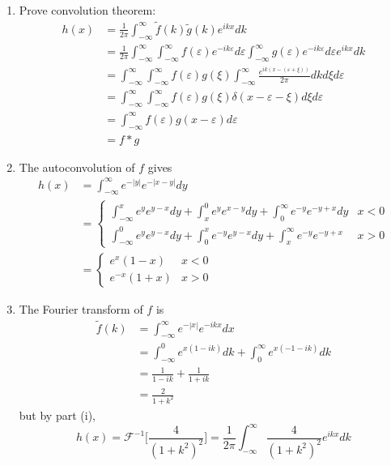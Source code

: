 \documentclass[a4paper]{article}
\begin{document}
\begin{ans}\leavevmode
\begin{enumerate}[label=(\roman*)]
\item Prove convolution theorem:
\begin{align}
    h(x)&=\frac{1}{2\pi}\int_{-\infty}^\infty\tilde{f}(k)\tilde{g}(k)e^{ikx}dk\nonumber\\&=\frac{1}{2\pi}\int_{-\infty}^\infty\int_{-\infty}^\infty f(\varepsilon)e^{-ik\varepsilon}d\varepsilon\int_{-\infty}^\infty g(\varepsilon)e^{-ik\varepsilon}d\varepsilon e^{ikx}dk\nonumber\\&=\int_{-\infty}^\infty\int_{-\infty}^\infty f(\varepsilon)g(\xi)\int_{-\infty}^\infty\frac{e^{ik(x-(\varepsilon+\xi))}}{2\pi}dkd\xi d\varepsilon\nonumber\\&=\int_{-\infty}^\infty \int_{-\infty}^\infty f(\varepsilon)g(\xi)\delta(x-\varepsilon-\xi)d\xi d\varepsilon\nonumber\\&=\int_{-\infty}^\infty f(\varepsilon)g(x-\varepsilon)d\varepsilon\nonumber\\&=f*g\nonumber
\end{align}
\item The autoconvolution of $f$ gives
\begin{align}
    h(x)&=\int_{-\infty}^\infty e^{-|y|}e^{-|x-y|}dy\nonumber\\&=\left\{
        \begin{array}{ll}
      \int_{-\infty}^x e^ye^{y-x}dy+\int_x^0e^ye^{x-y}dy+\int_0^\infty e^{-y}e^{-y+x}dy& x<0 \\
      \int_{-\infty}^0e^ye^{y-x}dy+\int_0^x e^{-y}e^{y-x}dy+\int_x^\infty e^{-y}e^{-y+x}& x>0
        \end{array}
    \right.\nonumber\\&=\left\{
        \begin{array}{ll}
      e^x(1-x)& x<0 \\
      e^{-x}(1+x)& x>0
        \end{array}
    \right.\nonumber
\end{align}
\item The Fourier transform of $f$ is
\begin{align}
    \tilde{f}(k)&=\int_{-\infty}^\infty e^{-|x|}e^{-ikx}dx\nonumber\\&=\int_{-\infty}^0e^{x(1-ik)}dk+\int_0^\infty e^{x(-1-ik)}dk\nonumber\\&=\frac{1}{1-ik}+\frac{1}{1+ik}\nonumber\\&=\frac{2}{1+k^2}\nonumber
\end{align}
but by part (i),
$$h(x)=\mathcal{F}^{-1}\bigg[\frac{4}{(1+k^2)^2}\bigg]=\frac{1}{2\pi}\int_{-\infty}^\infty\frac{4}{(1+k^2)^2}e^{ikx}dk$$


\end{enumerate}
\end{ans}
\end{document}
